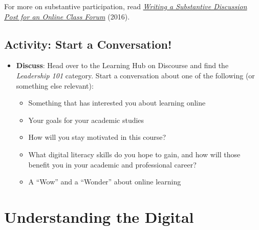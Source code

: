 \documentclass[
  letterpaper,
  DIV=11,
  numbers=noendperiod]{scrreprt}
\providecommand{\tightlist}{%
  \setlength{\itemsep}{0pt}\setlength{\parskip}{0pt}}\usepackage{longtable,booktabs,array}
\begin{document}
For more on substantive participation, read
\href{https://apuedge.com/writing-a-substantive-discussion-post-for-an-online-class-forum/}{\emph{Writing
a Substantive Discussion Post for an Online Class Forum}} (2016).

\subsection{Activity: Start a
Conversation!}\label{activity-start-a-conversation}

\begin{tcolorbox}[enhanced jigsaw, toprule=.15mm, colback=white, colframe=quarto-callout-note-color-frame, bottomtitle=1mm, leftrule=.75mm, coltitle=black, titlerule=0mm, rightrule=.15mm, colbacktitle=quarto-callout-note-color!10!white, left=2mm, title={Learning Activity}, opacitybacktitle=0.6, opacityback=0, breakable, toptitle=1mm, arc=.35mm, bottomrule=.15mm]

\begin{itemize}
\tightlist
\item
  \textbf{Discuss}: Head over to the Learning Hub on Discourse and find
  the \emph{Leadership 101} category. Start a conversation about one of
  the following (or something else relevant):

  \begin{itemize}
  \tightlist
  \item
    Something that has interested you about learning online
  \item
    Your goals for your academic studies
  \item
    How will you stay motivated in this course?
  \item
    What digital literacy skills do you hope to gain, and how will those
    benefit you in your academic and professional career?
  \item
    A ``Wow'' and a ``Wonder'' about online learning
  \end{itemize}
\end{itemize}

\end{tcolorbox}

\section{Understanding the Digital}\label{understanding-the-digital}
\end{document}
